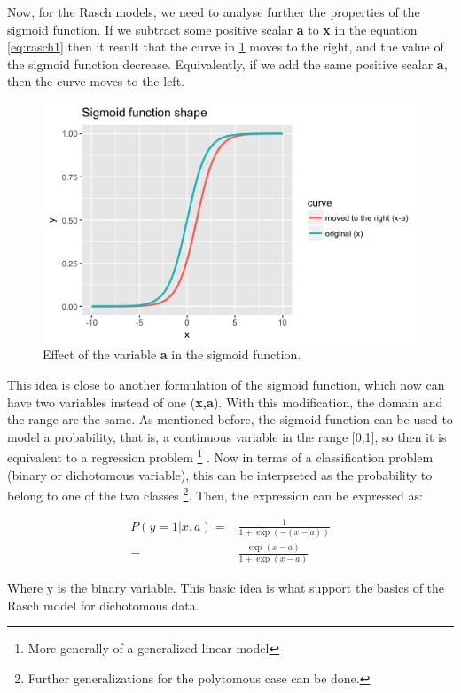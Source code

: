 Now, for the Rasch models, we need to analyse further the properties of the sigmoid function. If we subtract some positive scalar \textbf{a} to \textbf{x} in the equation \ref{eq:rasch1} then it result that the curve in \cref{img:sigmoid2} moves to the right, and the value of the sigmoid function decrease. Equivalently, if we add the same positive scalar \textbf{a}, then the curve moves to the left.

\begin{figure}[ht!]
  \centering
  \includegraphics[width=.75\linewidth]{img/sigmoid_left.png}
  \caption{Effect of the variable \textbf{a} in the sigmoid function.}
  \label{img:sigmoid2}
\end{figure}


This idea is close to another formulation of the sigmoid function, which now can have two variables instead of one (\textbf{x,a}). With this modification, the domain and the range are the same. As mentioned before, the sigmoid function can be used to model a probability, that is, a continuous variable in the range [0,1], so then it is equivalent to a regression problem \footnote{More generally of a generalized linear model} \cite{friedman2009elements}. Now in terms of a classification problem (binary or dichotomous variable), this can be interpreted as the probability to belong to one of the two classes \footnote{Further generalizations for the polytomous case can be done.}. Then, the expression can be expressed as:

\begin{equation}
\begin{aligned}
\label{eq:rasch2}
 P(y = 1 | x,a) =& \frac{1}{1+\exp(-(x-a))} \\[2.5ex]
 =& \frac{\exp(x-a)}{1+\exp(x-a)}
\end{aligned}
\end{equation}

Where y is the binary variable. This basic idea is what support the basics of the Rasch model for dichotomous data.


